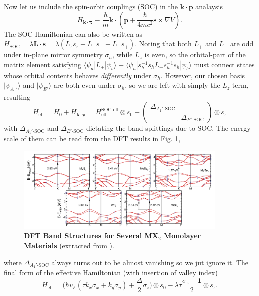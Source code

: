 Now let us include the spin-orbit couplings (SOC) in the $\bm k\cdot\bm p$ analaysis
\begin{equation*}
    H_{\bm k\cdot\bm\pi}\equiv\frac{\hbar}{m}\bm k\cdot\left(\bm p+\frac{\hbar}{4mc^2}\bm s\times\nabla V\right).
\end{equation*}
The SOC Hamiltonian can also be written as $H_{\text{SOC}}=\lambda\bm L\cdot\bm  s=\lambda(L_z s_z + L_+  s_- + L_-  s_+)$. Noting that both $L_+$ and $L_-$ are odd under in-plane mirror symmetry $\sigma_h$, while $L_z$ is even, so the orbital-part of the matrix element satisfying $\langle\psi_a|L_\pm|\psi_b\rangle\equiv\langle\psi_a| s_h^{-1}  s_h L_\pm s_h^{-1} s_h|\psi_b\rangle$ must connect states whose orbital contents behaves \emph{differently} under $\sigma_h$. However, our chosen basis $|\psi_{A_1'}\rangle$ and $|\psi_{E'}\rangle$ are both even under $\sigma_h$, so we are left with simply the $L_z$ term, resulting
\begin{equation}
    H_{\text{eff}}=H_0+H_{\bm k\cdot\bm\pi}=H_{\text{eff}}^{\text{SOC off}}\otimes s_0 + \begin{pmatrix}
        \Delta_{A_1'\text{-SOC}} &                        \\
                                 & \Delta_{E'\text{-SOC}}
    \end{pmatrix}\otimes s_z
\end{equation}
with $\Delta_{A_1'\text{-SOC}}$ and $\Delta_{E'\text{-SOC}}$ dictating the band splittings due to SOC. The energy scale of them can be read from the DFT results in Fig. \ref{fig:monolayer_TMD_band_structure},
\begin{figure}[!htp]
    \centering
    \includegraphics[width=0.9\textwidth]{figures/Background/monolayer_TMD_band_structure.png}
    \caption{\textbf{DFT Band Structures for Several MX$_2$ Monolayer Materials} (extracted from \cite{ramasubramaniam2012large}).}
    \label{fig:monolayer_TMD_band_structure}
\end{figure}
where $\Delta_{A_1'\text{-SOC}}$ always turns out to be almost vanishing so we jut ignore it. The final form of the effective Hamiltonian (with insertion of valley index)
\begin{equation}\label{eq:MoS2 kdotp}
    H_{\text{eff}}=\bigg(\hbar v_F(\tau k_x\sigma_x+k_y\sigma_y)+\frac{\Delta}{2}\sigma_z\bigg)\otimes s_0 - \lambda\tau\frac{\sigma_z-\mathbf 1}{2}\otimes s_z.
\end{equation}

